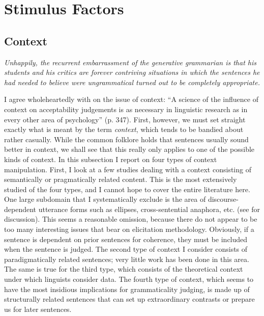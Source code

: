 \section{Stimulus Factors} \label{sec:5.3}
\subsection{Context} \label{sec:5.3.1} 

\epigraph{\textit{Unhappily, the recurrent embarrassment of the generative grammarian is that his students and his critics are forever contriving situations in which the sentences he had needed to believe were ungrammatical turned out to be completely appropriate.}\\[-2\baselineskip]}{\citep{Fillmore1973}}

\noindent
{}I agree wholeheartedly with \citet{Bever1970a} on the issue of context: ``A science of the influence of context on acceptability judgements is as necessary in linguistic research as in every other area of psychology'' (p. 347). First, however, we must set straight exactly what is meant by the term \textit{context}, which tends to be bandied about rather casually. While the common folklore holds that sentences usually sound better in context, we shall see that this really only applies to one of
the possible kinds of context. In this subsection I report on four types of context manipulation. First, I look at a few studies dealing with a context consisting of semantically or pragmatically related content. This is the most extensively studied of the four types, and I cannot hope to cover the entire literature here. One large subdomain that I systematically exclude is the area of discourse-dependent utterance forms such as ellipses, cross-sentential anaphora, etc. (see  \citet{vanDijk1977} for discussion). This seems a reasonable omission, because there do not appear to be too many interesting issues that bear on elicitation methodology. Obviously, if a sentence is dependent on prior sentences for coherence, they must be included when the sentence is judged. The second type of context I consider consists of paradigmatically related sentences; very little work has been done in this area. The same is true for the third type, which consists of the theoretical context under which linguists consider data. The fourth type of context, which seems to have the most insidious implications for grammaticality judging, is made up of structurally related sentences that can set up extraordinary contrasts or prepare us for later sentences.

